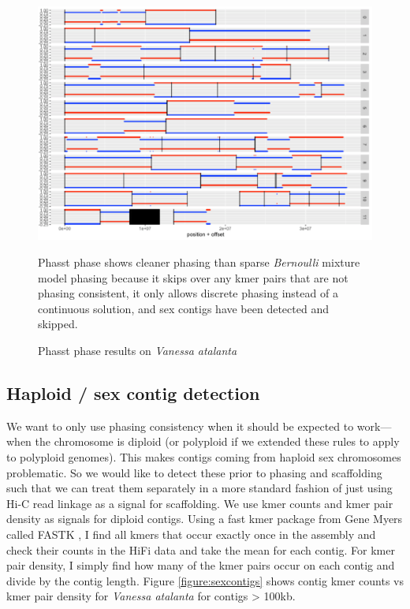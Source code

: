 {\begin{figure}[htbp!]
\caption{Phasst phase results on \textit{Vanessa atalanta}}
\label{figure:phasstphase}
\begin{centering}
\includegraphics[width=\textwidth]{phasstphase.png}
\par{Phasst phase shows cleaner phasing than sparse \textit{Bernoulli} mixture model phasing because it skips over any kmer pairs that are not phasing consistent, it only allows discrete phasing instead of a continuous solution, and sex contigs have been detected and skipped. }
\end{centering}
\end{figure}

\subsection{Haploid / sex contig detection}

\par{
We want to only use phasing consistency when it should be expected to work---when the chromosome is diploid (or polyploid if we extended these rules to apply to polyploid genomes). This makes contigs coming from haploid sex chromosomes problematic. So we would like to detect these prior to phasing and scaffolding such that we can treat them separately in a more standard fashion of just using Hi-C read linkage as a signal for scaffolding. We use kmer counts and kmer pair density as signals for diploid contigs. Using a fast kmer package from Gene Myers called FASTK \cite{fastk}, I find all kmers that occur exactly once in the assembly and check their counts in the HiFi data and take the mean for each contig. For kmer pair density, I simply find how many of the kmer pairs occur on each contig and divide by the contig length. Figure \ref{figure:sexcontigs} shows contig kmer counts vs kmer pair density for \textit{Vanessa atalanta} for contigs > 100kb.
}

}
